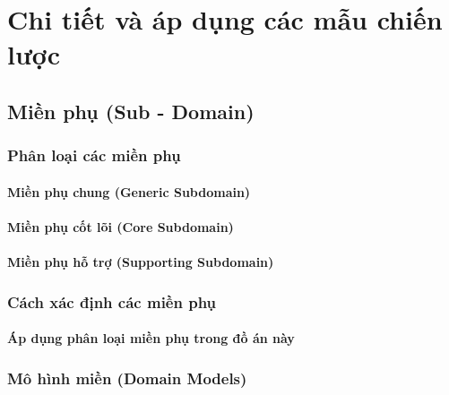 \documentclass{report} %
\begin{document}
% 


\chapter{Chi tiết và áp dụng các mẫu chiến lược}



\newpage

\section{Miền phụ (Sub - Domain)}



\subsection{Phân loại các miền phụ}



\subsubsection{Miền phụ chung (Generic Subdomain)}



\subsubsection{Miền phụ cốt lõi (Core Subdomain)}



\subsubsection{Miền phụ hỗ trợ (Supporting Subdomain)}



\newpage

\subsection{Cách xác định các miền phụ}




\subsubsection{Áp dụng phân loại miền phụ trong đồ án này}

% 

\subsection{Mô hình miền (Domain Models)}

\end{document}
